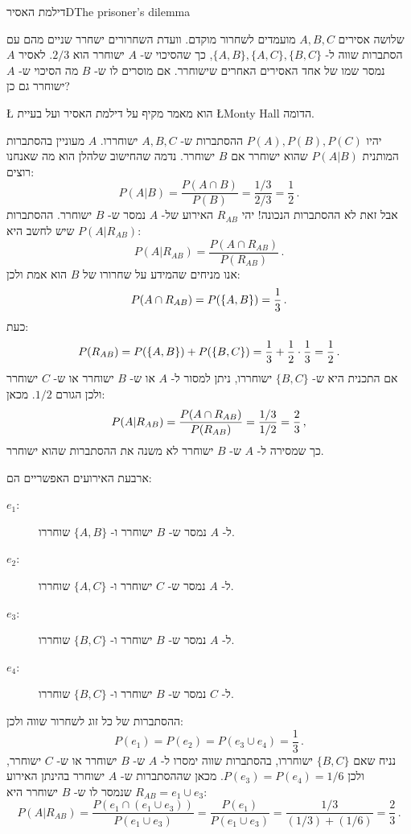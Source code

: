 





\begin{prob}{דילמת האסיר}{D}{The prisoner's dilemma}

שלושה אסירים 
$A,B,C$
מועמדים לשחרור מוקדם. וועדת השחרורים ישחרר שניים מהם עם הסתברות שווה ל-%
$\{A,B\}, \{A,C\}, \{B,C\}$, 
כך שהסיכוי ש-%
$A$
ישוחרר הוא
$2/3$.
לאסיר 
$A$
נמסר שמו של אחד האסירים האחרים שישוחרר. אם מוסרים לו ש-%
$B$
מה הסיכוי ש-%
$A$
ישוחרר גם כן?

\L{\cite{carlton}}
הוא מאמר מקיף על דילמת האסיר ועל בעיית 
\L{Monty Hall}
הדומה.
\end{prob}


יהיו 
$P(A), P(B), P(C)$
ההסתברות ש-%
$A,B,C$
ישוחררו.
$A$
מעוניין בהסתברות המותנית 
$P(A|B)$
שהוא ישוחרר אם 
$B$
ישוחרר. נדמה שהחישוב שלהלן הוא מה שאנחנו רוצים:
\[
P(A|B) = \frac{P(A\cap B)}{P(B)} = \frac{1/3}{2/3}=\frac{1}{2}\,.
\]
אבל זאת לא ההסתברות הנכונה! יהי 
$R_{AB}$
האירוע של-%
$A$
נמסר ש-%
$B$
ישוחרר. ההסתברות שיש לחשב היא
$P(A|R_{AB})$:
\[
P(A|R_{AB}) = \frac{P(A\cap R_{AB})}{P(R_{AB})}\,.
\]
אנו מניחים שהמידע על שחרורו של
$B$
הוא אמת ולכן:
\[
P(A\cap R_{AB})=P(\{A,B\})=\displaystyle\frac{1}{3}\,.
\]
כעת:
\[
P(R_{AB})=P(\{A,B\})+P(\{B,C\})=\displaystyle\frac{1}{3}+\displaystyle\frac{1}{2}\cdot \displaystyle\frac{1}{3}=\displaystyle\frac{1}{2}\,.
\]
אם התכנית היא ש-%
$\{B,C\}$
ישוחררו, ניתן למסור ל-%
$A$
או ש-%
$B$
ישוחרר או ש-%
$C$
ישוחרר ולכן הגורם 
$1/2$.
מכאן:
\[
P(A|R_{AB}) = \frac{P(A\cap R_{AB})}{P(R_{AB})} = \displaystyle\frac{1/3}{1/2}=\displaystyle\frac{2}{3}\,,
\]
כך שמסירה ל-%
$A$
ש-%
$B$
ישוחרר לא משנה את ההסתברות שהוא ישוחרר.


ארבעת האירועים האפשריים הם:
\begin{description}
\item[$e_1$:] 
ל-%
$A$
נמסר ש-%
$B$
ישוחרר ו-%
$\{A,B\}$
שוחררו.
\item[$e_2$:]
ל-%
$A$
נמסר ש-%
$C$
ישוחרר ו-%
$\{A,C\}$
שוחררו.
\item[$e_3$:]
ל-%
$A$
נמסר ש-%
$B$
ישוחרר ו-%
$\{B,C\}$
שוחררו.
\item[$e_4$:]
ל-%
$C$
נמסר ש-%
$B$
ישוחרר ו-%
$\{B,C\}$
שוחררו.
\end{description}
ההסתברות של כל זוג לשחרור שווה ולכן:
\[
P(e_1)=P(e_2)=P(e_3\cup e_4)=\frac{1}{3}\,.
\]
נניח שאם 
$\{B,C\}$
ישוחררו, בהסתברות שווה ימסרו ל-%
$A$
ש-%
$B$
ישוחרר או ש-%
$C$
ישוחרר, ולכן
$P(e_3)=P(e_4)=1/6$.
מכאן שההסתברות ש-%
$A$
ישוחרר בהינתן האירוע 
$R_{AB}=e_1\cup e_3$
שנמסר לו ש-%
$B$
ישוחרר היא:
\[
P(A|R_{AB}) = \frac{P(e_1\cap(e_1\cup e_3))}{P(e_1\cup e_3)}=\frac{P(e_1)}{P(e_1\cup e_3)}=\frac{1/3}{(1/3)+(1/6)}=\frac{2}{3}\,.
\]

